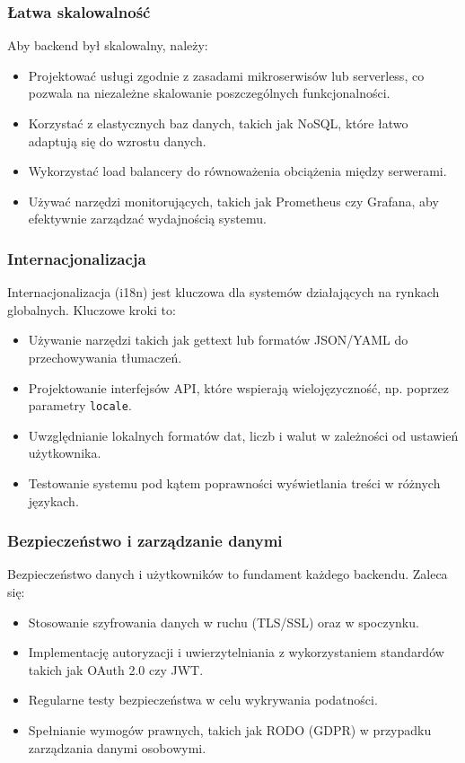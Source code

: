 \subsubsection{Łatwa skalowalność}
Aby backend był skalowalny, należy:
\begin{itemize}
	\item Projektować usługi zgodnie z zasadami mikroserwisów lub serverless, co pozwala na niezależne skalowanie poszczególnych funkcjonalności.
	\item Korzystać z elastycznych baz danych, takich jak NoSQL, które łatwo adaptują się do wzrostu danych.
	\item Wykorzystać load balancery do równoważenia obciążenia między serwerami.
	\item Używać narzędzi monitorujących, takich jak Prometheus czy Grafana, aby efektywnie zarządzać wydajnością systemu.
\end{itemize}

\subsubsection{Internacjonalizacja}
Internacjonalizacja (i18n) jest kluczowa dla systemów działających na rynkach globalnych. Kluczowe kroki to:
\begin{itemize}
	\item Używanie narzędzi takich jak gettext lub formatów JSON/YAML do przechowywania tłumaczeń.
	\item Projektowanie interfejsów API, które wspierają wielojęzyczność, np. poprzez parametry \texttt{locale}.
	\item Uwzględnianie lokalnych formatów dat, liczb i walut w zależności od ustawień użytkownika.
	\item Testowanie systemu pod kątem poprawności wyświetlania treści w różnych językach.
\end{itemize}

\subsubsection{Bezpieczeństwo i zarządzanie danymi}
Bezpieczeństwo danych i użytkowników to fundament każdego backendu. Zaleca się:
\begin{itemize}
	\item Stosowanie szyfrowania danych w ruchu (TLS/SSL) oraz w spoczynku.
	\item Implementację autoryzacji i uwierzytelniania z wykorzystaniem standardów takich jak OAuth 2.0 czy JWT.
	\item Regularne testy bezpieczeństwa w celu wykrywania podatności.
	\item Spełnianie wymogów prawnych, takich jak RODO (GDPR) w przypadku zarządzania danymi osobowymi.
\end{itemize}


